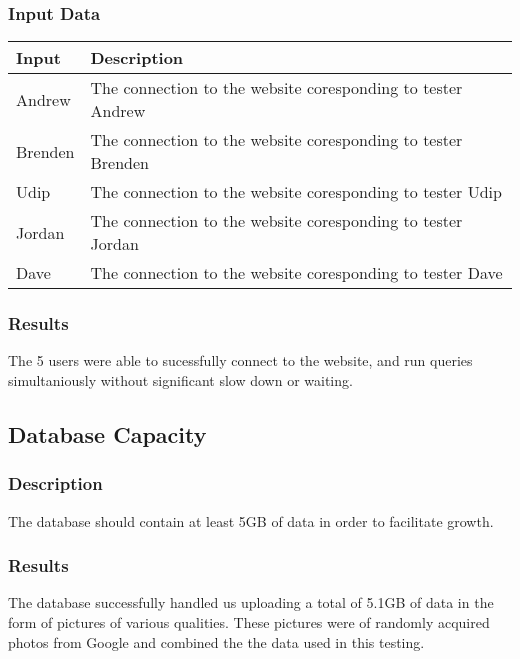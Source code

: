 \documentclass{scrreprt}
\begin{document}
\subsubsection{Input Data}
 \centering
 \begin{tabular}{p{3cm}p{6cm}}
 \hline\hline
 Input & Description\\
 \hline\hline
  Andrew & The connection to the website coresponding to tester Andrew \\
 \hline
 Brenden & The connection to the website coresponding to tester Brenden \\
 \hline
 Udip & The connection to the website coresponding to tester Udip \\
 \hline
 Jordan & The connection to the website coresponding to tester Jordan \\
 \hline
 Dave & The connection to the website coresponding to tester Dave \\
 \hline
 \end{tabular}
\subsubsection{Results}
\begin{flushleft}
The 5 users were able to sucessfully connect to the website, and run queries simultaniously without significant slow down or waiting.
\end{flushleft}

\subsection{Database Capacity}
\subsubsection{Description}
\begin{flushleft}
The database should contain at least 5GB of data in order to facilitate growth.
\end{flushleft}
\subsubsection{Results}
\begin{flushleft}
The database successfully handled us uploading a total of 5.1GB of data in the form of pictures of various qualities. These pictures were of randomly acquired photos from Google and combined the the data used in this testing.
\end{flushleft}
\end{document}
